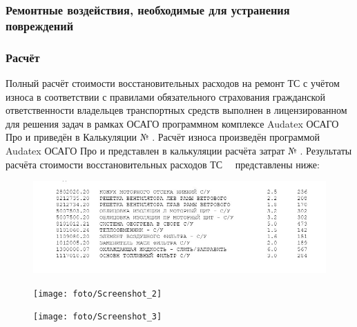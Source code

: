 \subsubsection{Ремонтные воздействия, необходимые для устранения повреждений}
 
%
\subsubsection{ Расчёт}
    
\indent Полный расчёт стоимости восстановительных расходов на ремонт ТС с учётом износа в соответствии с правилами обязательного страхования гражданской ответственности владельцев транспортных средств выполнен в  лицензированном для решения задач в рамках ОСАГО программном комплексе   Audatex ОСАГО Про и приведён в Калькуляции № \NomerDoc.
 Расчёт износа произведён программой  Audatex ОСАГО Про и представлен  в калькуляции расчёта затрат № \NomerDoc.
\indent Результаты расчёта  стоимости восстановительных расходов ТС \, \, представлены ниже:\\
  
  
\begin{figure}[H]
        	\centering
        	\includegraphics[width=0.95\linewidth]{foto/Screenshot_1}
        \end{figure}
  
    \begin{figure}[H]
    	\centering
    	\texttt{[image: foto/Screenshot\_2]}
    \end{figure}
    \begin{figure}[H]
    	\centering
    	\texttt{[image: foto/Screenshot\_3]}
    \end{figure}
    \medskip
    \renewcommand\baselinestretch{1.2}\small\normalsize
    

